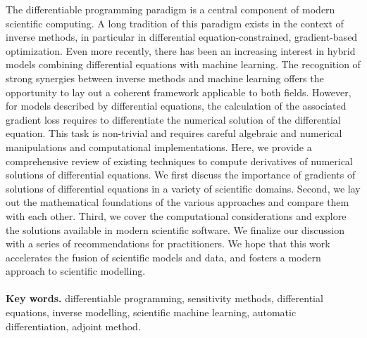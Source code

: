 {\footnotesize
The differentiable programming paradigm is a central component of modern scientific computing. 
A long tradition of this paradigm exists in the context of inverse methods, in particular in differential equation-constrained, gradient-based optimization.
Even more recently, there has been an increasing interest in hybrid models combining differential equations with machine learning. 
The recognition of strong synergies between inverse methods and machine learning offers the opportunity to lay out a coherent framework applicable to both fields.
However, for models described by differential equations, the calculation of the associated gradient loss requires to differentiate the numerical solution of the differential equation. 
This task is non-trivial and requires careful algebraic and numerical manipulations and computational implementations.
Here, we provide a comprehensive review of existing techniques to compute derivatives of numerical solutions of differential equations.
We first discuss the importance of gradients of solutions of differential equations in a variety of scientific domains.
Second, we lay out the mathematical foundations of the various approaches and compare them with each other. 
Third, we cover the computational considerations and explore the solutions available in modern scientific software.
We finalize our discussion with a series of recommendations for practitioners. 
We hope that this work accelerates the fusion of scientific models and data, and fosters a modern approach to scientific modelling.
\\ \\
\noindent \textbf{Key words.} differentiable programming, sensitivity methods, differential equations, inverse modelling, scientific machine learning, automatic differentiation, adjoint method.
}
